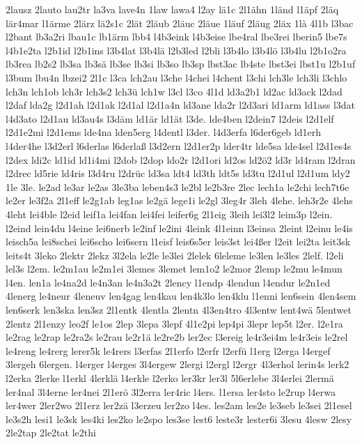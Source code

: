 {2lausz
2lauto
lau2tr
la3va
lave4n
1law
lawa4
l2ay
lä1c
2l1ähn
1länd
l1äpf
2läq
lär4mar
l1ärme
2lärz
lä2s1c
2lät
2läub
2läuc
2läue
1läuf
2läug
2läx
1là
4l1b
l3bac
l2bant
lb3a2ri
lbau1c
lb1ärm
lbb4
l4b3eink
l4b3eise
lbe4ral
lbe3rei
lberin5
lbe7s
l4b1e2ta
l2b1id
l2b1ins
l3b4lat
l3b4lä
l2b3led
l2bli
l3b4lo
l3b4lö
l3b4lu
l2b1o2ra
lb3rea
lb2s2
lb3sa
lb3sä
lb3se
lb3si
lb3so
lb3sp
lbst3ac
lb4ste
lbst3ei
lbst1u
l2b1uf
l3bum
lbu4n
lbzei2
2l1c
l3ca
lch2au
l3che
l4chei
l4chent
l3chi
lch3le
lch3li
l3chlo
lch3n
lch1ob
lch3r
lch3s2
lch3ü
lch1w
l3cl
l3co
4l1d
ld3a2b1
ld2ac
ld3ack
l2dad
l2daf
lda2g
l2d1ah
l2d1ak
l2d1al
l2d1a4n
ld3ane
lda2r
l2d3ari
ld1arm
ld1ass
l3dat
l4d3ato
l2d1au
ld3au4s
l3däm
ld1är
ld1ät
l3de.
lde4ben
l2dein7
l2deis
l2d1elf
l2d1e2mi
l2d1ems
lde4na
lden5erg
l4dentl
l3der.
l4d3erfa
l6der6geb
ld1erh
l4der4he
l3d2erl
l6derlas
l6derlaß
l3d2ern
l2d1er2p
lder4tr
lde5sa
lde4sel
l2d1es4s
l2dex
ldi2c
ld1id
ld1i4mi
l2dob
l2dop
ldo2r
l2d1ori
ld2os
ld2ö2
ld3r
ld4ram
l2dran
l2drec
ld5rie
ld4ris
l3d4ru
l2drüc
ld3sa
ldt4
ld3th
ldt5s
ld3tu
l2d1ul
l2d1um
ldy2
1le
3le.
le2ad
le3ar
le2as
3le3ba
leben4s3
le2bl
le2b3re
2lec
lech1a
le2chi
lech7t6e
le2er
le3f2a
2l1eff
le2g1ab
leg1as
le2gä
lege1i
le2gl
3leg4r
3leh
4lehe.
leh3r2e
4lehs
4leht
lei4ble
l2eid
leif1a
lei4fan
lei4fei
leifer6g
2l1eig
3leih
lei3l2
leim3p
l2ein.
l2eind
lein4du
l4eine
lei6nerb
le2inf
le2ini
4leink
4l1einn
l3einsa
2leint
l2einu
le4is
leisch5a
lei8schei
lei6scho
lei6sern
l1eisf
leis6s5er
leis3st
lei4ßer
l2eit
lei2ta
leit3sk
leits4t
3leko
2lektr
2lekz
3l2ela
le2le
le3lei
2lelek
6leleme
le3len
le3les
2lelf.
l2eli
lel3s
l2em.
le2m1au
le2m1ei
3lemes
3lemet
lem1o2
le2mor
2lemp
le2mu
le4mun
l4en.
len1a
le4na2d
le4n3an
le4n3a2t
2lency
l1endp
4lendun
l4endur
le2n1ed
4lenerg
le4neur
4leneuv
len4gag
len4kau
len4k3lo
len4klu
l1enni
len6sein
4len4sem
len6serk
len3ska
len3sz
2l1entk
4lentla
2lentn
4l3en4tro
4l3entw
lent4wä
5lentwet
2lentz
2l1enzy
leo2f
le1os
2lep
3lepa
3lepf
4l1e2pi
lep4pi
3lepr
lep5t
l2er.
l2e1ra
le2rag
le2rap
le2ra2s
le2rau
le2r1ä
le2re2b
ler2ec
l3ereig
le4r3ei4m
le4r3eis
le2rel
le4reng
le4rerg
lerer5k
le4rers
l3erfas
2l1erfo
l2erfr
l2erfü
l1erg
l2erga
l4ergef
3lergeh
6lergen.
l4erger
l4erges
3l4ergew
2lergi
l2ergl
l2ergr
4l3erhol
lerin4s
lerk2
l2erka
2lerke
l1erkl
4lerklä
l4erkle
l2erko
ler3kr
ler3l
5l6erlebe
3l4erlei
2lermä
ler4nal
3l4erne
ler4nei
2l1erö
3l2erra
ler4ric
l4ers.
l1ersa
ler4sto
le2rup
l4erwa
ler4wer
2ler2wo
2l1erz
ler2zä
l3erzeu
ler2zo
l4es.
les2am
les2e
le3seb
le3sei
2l1esel
le3s2h
lesi1
le3sk
les4ki
les2ko
le2spo
les3se
lest6
leste3r
lester6i
3lesu
4lesw
2lesy
2le2tap
2le2tat
le2thi
}
